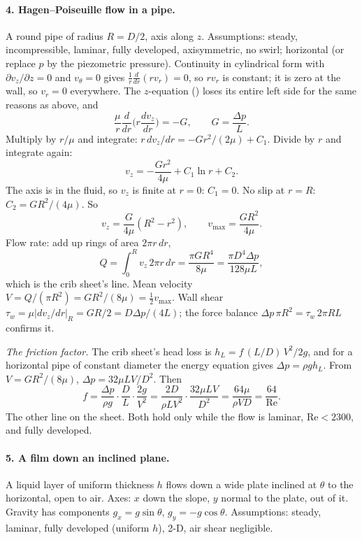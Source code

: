 \paragraph{4. Hagen--Poiseuille flow in a pipe.} A round pipe of radius $R = D/2$, axis along $z$. Assumptions: steady, incompressible, laminar, fully developed, axisymmetric, no swirl; horizontal (or replace $p$ by the piezometric pressure). Continuity in cylindrical form with $\partial v_z/\partial z = 0$ and $v_\theta = 0$ gives $\frac{1}{r}\frac{d}{dr}(r v_r) = 0$, so $r v_r$ is constant; it is zero at the wall, so $v_r = 0$ everywhere. The $z$-equation () loses its entire left side for the same reasons as above, and
\[
\frac{\mu}{r}\frac{d}{dr}\Big(r\frac{dv_z}{dr}\Big) = -G, \qquad G = \frac{\Delta p}{L}.
\]
Multiply by $r/\mu$ and integrate: $r\,dv_z/dr = -Gr^2/(2\mu) + C_1$. Divide by $r$ and integrate again:
\[
v_z = -\frac{G r^2}{4\mu} + C_1\ln r + C_2 .
\]
The axis is in the fluid, so $v_z$ is finite at $r = 0$: $C_1 = 0$. No slip at $r = R$: $C_2 = GR^2/(4\mu)$. So
\[
v_z = \frac{G}{4\mu}(R^2 - r^2), \qquad v_{\max} = \frac{GR^2}{4\mu}.
\]
Flow rate: add up rings of area $2\pi r\,dr$,
\[
Q = \int_0^R v_z\,2\pi r\,dr = \frac{\pi G R^4}{8\mu} = \frac{\pi D^4\Delta p}{128\mu L},
\]
which is the crib sheet's line. Mean velocity $V = Q/(\pi R^2) = GR^2/(8\mu) = \frac12 v_{\max}$. Wall shear $\tau_w = \mu|dv_z/dr|_R = GR/2 = D\Delta p/(4L)$; the force balance $\Delta p\,\pi R^2 = \tau_w\,2\pi RL$ confirms it.

\emph{The friction factor.} The crib sheet's head loss is $h_L = f\,(L/D)\,V^2/2g$, and for a horizontal pipe of constant diameter the energy equation gives $\Delta p = \rho g h_L$. From $V = GR^2/(8\mu)$, $\Delta p = 32\mu L V/D^2$. Then
\[
f = \frac{\Delta p}{\rho g}\cdot\frac{D}{L}\cdot\frac{2g}{V^2} = \frac{2D}{\rho L V^2}\cdot\frac{32\mu LV}{D^2} = \frac{64\mu}{\rho V D} = \frac{64}{\text{Re}} .
\]
The other line on the sheet. Both hold only while the flow is laminar, $\text{Re} < 2300$, and fully developed.

\paragraph{5. A film down an inclined plane.} A liquid layer of uniform thickness $h$ flows down a wide plate inclined at $\theta$ to the horizontal, open to air. Axes: $x$ down the slope, $y$ normal to the plate, out of it. Gravity has components $g_x = g\sin\theta$, $g_y = -g\cos\theta$. Assumptions: steady, laminar, fully developed (uniform $h$), 2-D, air shear negligible.

